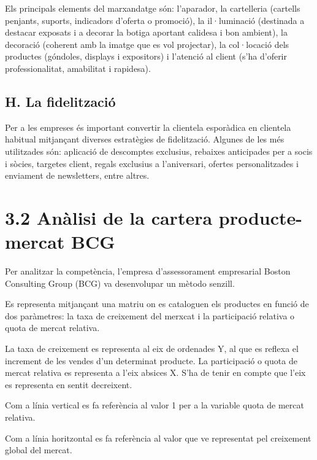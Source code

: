 \documentclass[
]{book}
\begin{document}
Els principals elements del marxandatge són: l'aparador, la cartelleria (cartells penjants, suports, indicadors d'oferta o promoció), la il·luminació (destinada a destacar exposats i a decorar la botiga aportant calidesa i bon ambient), la decoració (coherent amb la imatge que es vol projectar), la col·locació dels productes (góndoles, displays i expositors) i l'atenció al client (s'ha d'oferir professionalitat, amabilitat i rapidesa).

\hypertarget{h.-la-fidelitzaciuxf3}{%
\subsection*{H. La fidelització}\label{h.-la-fidelitzaciuxf3}}

Per a les empreses és important convertir la clientela esporàdica en clientela habitual mitjançant diverses estratègies de fidelització. Algunes de les més utilitzades són: aplicació de descomptes exclusius, rebaixes anticipades per a socis i sòcies, targetes client, regals exclusius a l'aniversari, ofertes personalitzades i enviament de newsletters, entre altres.

\hypertarget{anuxe0lisi-de-la-cartera-producte-mercat-bcg}{%
\section*{3.2 Anàlisi de la cartera producte-mercat BCG}\label{anuxe0lisi-de-la-cartera-producte-mercat-bcg}}

Per analitzar la competència, l'empresa d'assessorament empresarial Boston Consulting Group (BCG) va desenvolupar un mètodo senzill.

Es representa mitjançant una matriu on es cataloguen els productes en funció de dos paràmetres: la taxa de creixement del merxcat i la participació relativa o quota de mercat relativa.

La taxa de creixement es representa al eix de ordenades Y, al que es reflexa el increment de les vendes d'un determinat producte. La participació o quota de mercat relativa es representa a l'eix absices X. S'ha de tenir en compte que l'eix es representa en sentit decreixent.

Com a línia vertical es fa referència al valor 1 per a la variable quota de mercat relativa.

Com a línia horitzontal es fa referència al valor que ve representat pel creixement global del mercat.
\end{document}
